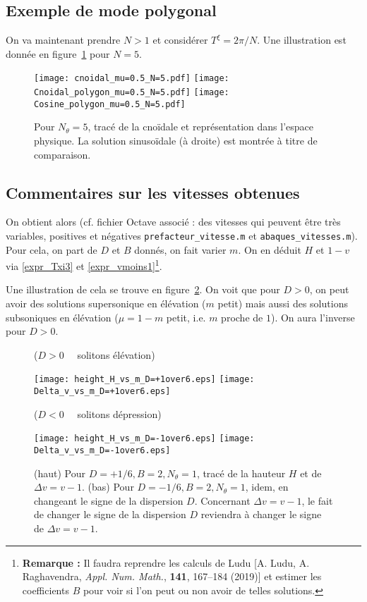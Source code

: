 \documentclass[10pt,a4paper, oneside, fleqn]{myarticle}
\begin{document}
\subsection{Exemple de mode polygonal}
On va maintenant prendre $N>1$ et considérer $T^\xi=2\pi/N$. Une illustration est donnée en figure~\ref{fig_cnoidal_N=5} pour $N=5$.
\begin{figure}[ht!]
  \centering
  \texttt{[image: cnoidal\_mu=0.5\_N=5.pdf]}
  \texttt{[image: Cnoidal\_polygon\_mu=0.5\_N=5.pdf]}
  \texttt{[image: Cosine\_polygon\_mu=0.5\_N=5.pdf]}
  \caption{Pour $N_\theta=5$, tracé de la cnoïdale et représentation dans l'espace physique. La solution sinusoïdale (à droite) est montrée à titre de comparaison.}\label{fig_cnoidal_N=5}
\end{figure}


\subsection{Commentaires sur les vitesses obtenues}

On obtient alors (cf. fichier \textsf{Octave} associé :  des vitesses qui peuvent être très variables, positives et  négatives \texttt{prefacteur\_vitesse.m} et \texttt{abaques\_vitesses.m}). Pour cela, on part de $D$ et $B$ donnés, on fait varier $m$. On en déduit $H$ et $1-v$ via \eqref{expr_Txi3} et \eqref{expr_vmoins1}\footnote{ \textbf{\sffamily Remarque : } Il faudra reprendre les calculs de Ludu [A. Ludu, A. Raghavendra, \emph{Appl. Num. Math.}, {\bfseries 141}, 167--184 (2019)] et estimer les coefficients $B$ pour voir si l'on peut ou non avoir de telles solutions.}.

Une illustration de cela se trouve en figure~\ref{fig_vitesse_hauteur}. On voit que pour $D>0$, on peut avoir des solutions supersonique en élévation ($m$ petit) mais aussi des solutions subsoniques en élévation ($\mu = 1-m$ petit, i.e. $m$ proche de $1$). On aura l'inverse pour  $D>0$.


\clearpage


\begin{figure}[ht!]
  \centering
  ($D >0 \quad $ \textsf{solitons élévation})

  \smallskip
  
  \texttt{[image: height\_H\_vs\_m\_D=+1over6.eps]}
  \qquad
  \texttt{[image: Delta\_v\_vs\_m\_D=+1over6.eps]}


  \medskip
  
  ($D <0 \quad $ \textsf{solitons dépression})

  \smallskip
  
  \texttt{[image: height\_H\_vs\_m\_D=-1over6.eps]}
  \qquad
  \texttt{[image: Delta\_v\_vs\_m\_D=-1over6.eps]}
  \caption{\textsf{(haut)} Pour $D=+1/6, B=2, N_\theta=1$, tracé de la hauteur $H$ et de $\Delta v = v-1$. \textsf{(bas)} Pour $D=-1/6, B=2, N_\theta=1$, idem, en changeant le signe de la dispersion $D$. Concernant $\Delta v = v-1$, le fait de changer le signe de la dispersion $D$ reviendra à changer le signe de $\Delta v = v-1$.}\label{fig_vitesse_hauteur}
\end{figure}
\end{document}
